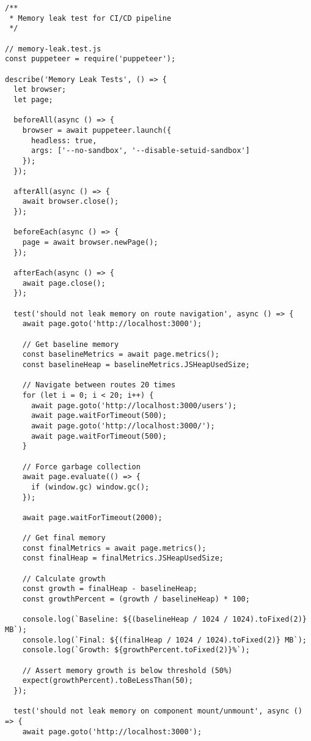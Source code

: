 \documentclass[11pt]{article}
\begin{document}
\begin{verbatim}
/**
 * Memory leak test for CI/CD pipeline
 */

// memory-leak.test.js
const puppeteer = require('puppeteer');

describe('Memory Leak Tests', () => {
  let browser;
  let page;
  
  beforeAll(async () => {
    browser = await puppeteer.launch({
      headless: true,
      args: ['--no-sandbox', '--disable-setuid-sandbox']
    });
  });
  
  afterAll(async () => {
    await browser.close();
  });
  
  beforeEach(async () => {
    page = await browser.newPage();
  });
  
  afterEach(async () => {
    await page.close();
  });
  
  test('should not leak memory on route navigation', async () => {
    await page.goto('http://localhost:3000');
    
    // Get baseline memory
    const baselineMetrics = await page.metrics();
    const baselineHeap = baselineMetrics.JSHeapUsedSize;
    
    // Navigate between routes 20 times
    for (let i = 0; i < 20; i++) {
      await page.goto('http://localhost:3000/users');
      await page.waitForTimeout(500);
      await page.goto('http://localhost:3000/');
      await page.waitForTimeout(500);
    }
    
    // Force garbage collection
    await page.evaluate(() => {
      if (window.gc) window.gc();
    });
    
    await page.waitForTimeout(2000);
    
    // Get final memory
    const finalMetrics = await page.metrics();
    const finalHeap = finalMetrics.JSHeapUsedSize;
    
    // Calculate growth
    const growth = finalHeap - baselineHeap;
    const growthPercent = (growth / baselineHeap) * 100;
    
    console.log(`Baseline: ${(baselineHeap / 1024 / 1024).toFixed(2)} MB`);
    console.log(`Final: ${(finalHeap / 1024 / 1024).toFixed(2)} MB`);
    console.log(`Growth: ${growthPercent.toFixed(2)}%`);
    
    // Assert memory growth is below threshold (50%)
    expect(growthPercent).toBeLessThan(50);
  });
  
  test('should not leak memory on component mount/unmount', async () => {
    await page.goto('http://localhost:3000');
    

\end{verbatim}
\end{document}
